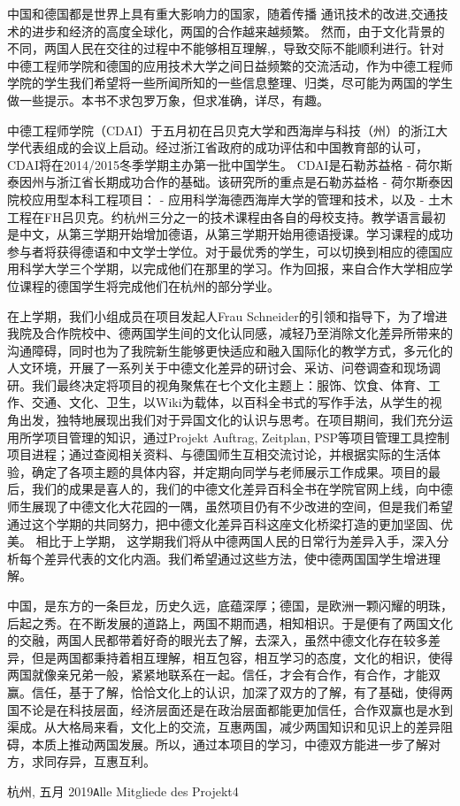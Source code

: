 \Huge\sffamily{} \par

\thispagestyle{empty}
 \vspace*{3cm}
 \normalfont\normalsize
 \raggedright
 \indent
 中国和德国都是世界上具有重大影响力的国家，随着传播 通讯技术的改进,交通技术的进步和经济的高度全球化，两国的合作越来越频繁。 然而，由于文化背景的不同，两国人民在交往的过程中不能够相互理解,，导致交际不能顺利进行。针对中德工程师学院和德国的应用技术大学之间日益频繁的交流活动，作为中德工程师学院的学生我们希望将一些所闻所知的一些信息整理、归类，尽可能为两国的学生做一些提示。本书不求包罗万象，但求准确，详尽，有趣。
\par
中德工程师学院（CDAI）于五月初在吕贝克大学和西海岸与科技（州）的浙江大学代表组成的会议上启动。经过浙江省政府的成功评估和中国教育部的认可，CDAI将在2014/2015冬季学期主办第一批中国学生。 CDAI是石勒苏益格 - 荷尔斯泰因州与浙江省长期成功合作的基础。该研究所的重点是石勒苏益格 - 荷尔斯泰因院校应用型本科工程项目： - 应用科学海德西海岸大学的管理和技术，以及 - 土木工程在FH吕贝克。约杭州三分之一的技术课程由各自的母校支持。教学语言最初是中文，从第三学期开始增加德语，从第三学期开始用德语授课。学习课程的成功参与者将获得德语和中文学士学位。对于最优秀的学生，可以切换到相应的德国应用科学大学三个学期，以完成他们在那里的学习。作为回报，来自合作大学相应学位课程的德国学生将完成他们在杭州的部分学业。
\par
 在上学期，我们小组成员在项目发起人Frau Schneider的引领和指导下，为了增进我院及合作院校中、德两国学生间的文化认同感，减轻乃至消除文化差异所带来的沟通障碍，同时也为了我院新生能够更快适应和融入国际化的教学方式，多元化的人文环境，开展了一系列关于中德文化差异的研讨会、采访、问卷调查和现场调研。我们最终决定将项目的视角聚焦在七个文化主题上：服饰、饮食、体育、工作、交通、文化、卫生，以Wiki为载体，以百科全书式的写作手法，从学生的视角出发，独特地展现出我们对于异国文化的认识与思考。在项目期间，我们充分运用所学项目管理的知识，通过Projekt Auftrag, Zeitplan, PSP等项目管理工具控制项目进程；通过查阅相关资料、与德国师生互相交流讨论，并根据实际的生活体验，确定了各项主题的具体内容，并定期向同学与老师展示工作成果。项目的最后，我们的成果是喜人的，我们的中德文化差异百科全书在学院官网上线，向中德师生展现了中德文化大花园的一隅，虽然项目仍有不少改进的空间，但是我们希望通过这个学期的共同努力，把中德文化差异百科这座文化桥梁打造的更加坚固、优美。
 相比于上学期， 这学期我们将从中德两国人民的日常行为差异入手，深入分析每个差异代表的文化内涵。我们希望通过这些方法，使中德两国国学生增进理解。
 \par
 中国，是东方的一条巨龙，历史久远，底蕴深厚；德国，是欧洲一颗闪耀的明珠，后起之秀。在不断发展的道路上，两国不期而遇，相知相识。于是便有了两国文化的交融，两国人民都带着好奇的眼光去了解，去深入，虽然中德文化存在较多差异，但是两国都秉持着相互理解，相互包容，相互学习的态度，文化的相识，使得两国就像亲兄弟一般，紧紧地联系在一起。信任，才会有合作，有合作，才能双赢。信任，基于了解，恰恰文化上的认识，加深了双方的了解，有了基础，使得两国不论是在科技层面，经济层面还是在政治层面都能更加信任，合作双赢也是水到渠成。从大格局来看，文化上的交流，互惠两国，减少两国知识和见识上的差异阻碍，本质上推动两国发展。所以，通过本项目的学习，中德双方能进一步了解对方，求同存异，互惠互利。
\vspace{\baselineskip}
\begin{flushright}\noindent
杭州, 五月 2019\hfill {\texttt Alle Mitgliede des Projekt4}\\
\end{flushright}
